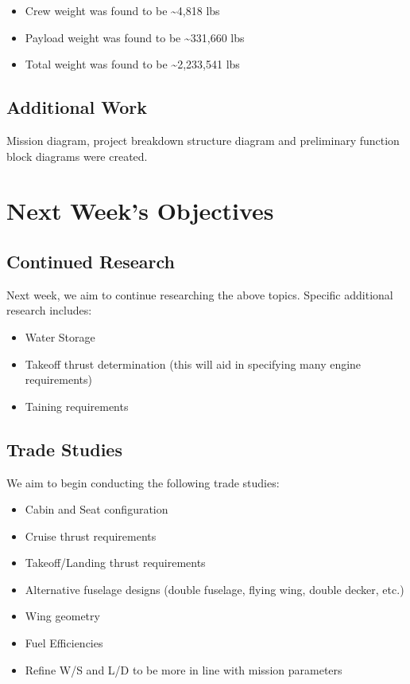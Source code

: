\documentclass[10pt,twocolumn]{article}  %
\begin{document}
\begin{itemize}
\tightlist
\item
  Crew weight was found to be \textasciitilde4,818 lbs
\item
  Payload weight was found to be \textasciitilde331,660 lbs
\item
  Total weight was found to be \textasciitilde2,233,541 lbs
\end{itemize}

\subsection{Additional Work}\label{additional-work}

Mission diagram, project breakdown structure diagram and preliminary
function block diagrams were created.

\section{Next Week's Objectives}\label{next-weeks-objectives}

\subsection{Continued Research}\label{continued-research}

Next week, we aim to continue researching the above topics. Specific
additional research includes:

\begin{itemize}
\tightlist
\item
  Water Storage
\item
  Takeoff thrust determination (this will aid in specifying many engine
  requirements)
\item
  Taining requirements
\end{itemize}

\subsection{Trade Studies}\label{trade-studies}

We aim to begin conducting the following trade studies:

\begin{itemize}
\tightlist
\item
  Cabin and Seat configuration
\item
  Cruise thrust requirements
\item
  Takeoff/Landing thrust requirements
\item
  Alternative fuselage designs (double fuselage, flying wing, double
  decker, etc.)
\item
  Wing geometry
\item
  Fuel Efficiencies
\item
  Refine W/S and L/D to be more in line with mission parameters
\end{itemize}
\end{document}
